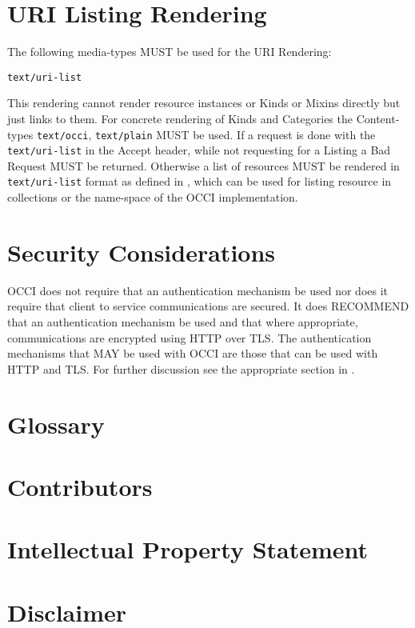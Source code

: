 \documentclass[10pt,a4paper]{article}
\begin{document}
\section{URI Listing Rendering}
\label{sec:urilist}
The following media-types MUST be used for the URI Rendering:

{\tt text/uri-list}

This rendering cannot render resource instances or Kinds or Mixins directly but just links to them. For concrete rendering of Kinds and Categories the Content-types \texttt{text/occi}, \texttt{text/plain} MUST be used. If a request is done with the \texttt{text/uri-list} in the Accept header, while not requesting for a Listing a Bad Request MUST be returned. Otherwise a list of resources MUST be rendered in \texttt{text/uri-list} format as defined in \cite{rfc2483}, which can be used for listing resource in collections or the name-space of the OCCI implementation.

\section{Security Considerations}
OCCI does not require that an authentication mechanism be used nor
does it require that client to service communications are secured. It
does RECOMMEND that an authentication mechanism be used and that where
appropriate, communications are encrypted using HTTP over TLS. The
authentication mechanisms that MAY be used with OCCI are those that
can be used with HTTP and TLS. For further discussion see the
appropriate section in \cite{occi:http_protocol}.

\section{Glossary}
\label{sec:glossary}


\section{Contributors}


\section{Intellectual Property Statement}


\section{Disclaimer}

\end{document}
